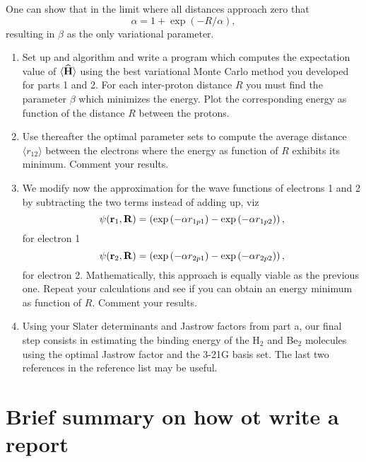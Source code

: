 \documentclass[10pt]{article}
\newcommand{\be}{\begin{equation}}
\newcommand{\ee}{\end{equation}}
\newcommand{\OP}[1]{{\bf\widehat{#1}}}
\begin{document}
One can show that in the limit where all distances approach zero that 
\be
    \alpha = 1+\exp{(-R/\alpha)},
    \label{eq:alpha}
\ee
resulting in $\beta$ as the only variational parameter.
\begin{enumerate}
\item Set up and algorithm and write a program which computes the 
expectation value of 
$\langle \OP{H} \rangle$
using the best variational Monte Carlo method 
you developed for parts 1 and 2.
For each inter-proton distance  $R$ you must find the parameter 
$\beta$ which minimizes the energy. Plot the corresponding energy as function
of the distance $R$ between the protons.
\item Use thereafter the optimal parameter sets to compute the 
average distance
$\langle r_{12} \rangle$ between the electrons where the energy as function of
$R$ exhibits its minimum. Comment your results.
\item 
We modify now the approximation for the wave functions of electrons 1 and 2
by subtracting the two terms instead of adding up, viz
\be
   \psi({\bf r}_1,{\bf R})=\left(\exp{(-\alpha r_{1p1})}
      -\exp{(-\alpha r_{1p2})}\right),
\ee
for electron 1 
\be
   \psi({\bf r}_2,{\bf R})=\left(\exp{(-\alpha r_{2p1})}
      -\exp{(-\alpha r_{2p2})}\right),
\ee
for electron 2. Mathematically, this approach is equally viable as the previous one.
Repeat your calculations and see if you can obtain an energy minimum as 
function of  $R$. Comment your results.

\item Using your Slater determinants and Jastrow factors from part a, our final step consists in estimating the binding energy of the H$_2$ and Be$_2$ molecules using the optimal Jastrow factor and the 3-21G basis set.
The last two references in the reference list may be useful.




\end{enumerate}

\section*{Brief summary on how ot write a report}
\end{document}
